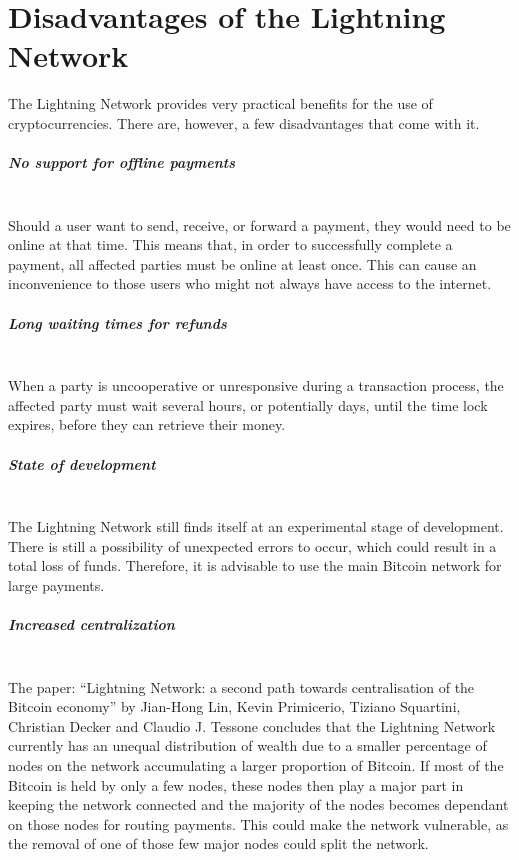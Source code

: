 \documentclass[a4paper, 12pt]{report}
\begin{document}
\chapter{Disadvantages of the Lightning Network}

\par The Lightning Network provides very practical benefits for the use of cryptocurrencies. There are, however, a few disadvantages that come with it.

\paragraph{No support for offline payments} \hspace{0pt} \\
Should a user want to send, receive, or forward a payment, they would need to be online at that time. This means that, in order to successfully complete a payment, all affected parties must be online at least once. This can cause an inconvenience to those users who might not always have access to the internet.

\paragraph{Long waiting times for refunds} \hspace{0pt} \\
When a party is uncooperative or unresponsive during a transaction process, the affected party must wait several hours, or potentially days, until the time lock expires, before they can retrieve their money.

\paragraph{State of development} \hspace{0pt} \\
The Lightning Network still finds itself at an experimental stage of development. There is still a possibility of unexpected errors to occur, which could result in a total loss of funds. Therefore, it is advisable to use the main Bitcoin network for large payments.

\paragraph{Increased centralization} \hspace{0pt} \\
The paper: “Lightning Network: a second path towards centralisation of the Bitcoin economy” \cite{jian} by Jian-Hong Lin, Kevin Primicerio, Tiziano Squartini, Christian Decker and Claudio J. Tessone concludes that the Lightning Network currently has an unequal distribution of wealth due to a smaller percentage of nodes on the network accumulating a larger proportion of Bitcoin. If most of the Bitcoin is held by only a few nodes, these nodes then play a major part in keeping the network connected and the majority of the nodes becomes dependant on those nodes for routing payments. This could make the network vulnerable, as the removal of one of those few major nodes could split the network.
\end{document}
